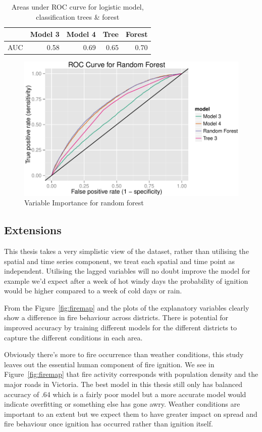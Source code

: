 \documentclass[11pt,a4paper]{article}
\begin{document}
\begin{table}
  \centering
  \begin{tabular}{r|rrrr}
    \toprule
        & Model 3 & Model 4 & Tree & Forest \\
    \midrule
    AUC & 0.58    & 0.69    & 0.65 & 0.70 \\
    \midrule
  \end{tabular}
  \caption{Areas under ROC curve for logistic model, classification trees \& forest}
  \label{table:AUC}
\end{table}

\begin{figure}
  \centering
	\includegraphics[width=.8\textwidth]{figures/roc_rf.pdf}
  \caption{Variable Importance for random forest}
  \label{fig:rocrf}
\end{figure}

\subsection{Extensions}

This thesis takes a very simplistic view of the dataset, rather than utilising the spatial and time series component, we treat each spatial and time point as independent. Utilising the lagged variables will no doubt improve the model for example we'd expect after a week of hot windy days the probability of ignition would be higher compared to a week of cold days or rain.

From the Figure~\ref{fig:firemap} and the plots of the explanatory variables clearly show a difference in fire behaviour across districts. There is potential for improved accuracy by training different models for the different districts to capture the different conditions in each area.

Obviously there's more to fire occurrence than weather conditions, this study leaves out the essential human component of fire ignition. We see in Figure~\ref{fig:firemap} that fire activity corresponds with population density and the major roads in Victoria. The best model in this thesis still only has balanced accuracy of .64 which is a fairly poor model but a more accurate model would indicate overfitting or something else has gone awry.  Weather conditions are important to an extent but we expect them to have greater impact on spread and fire behaviour once ignition has occurred rather than ignition itself.
\end{document}
